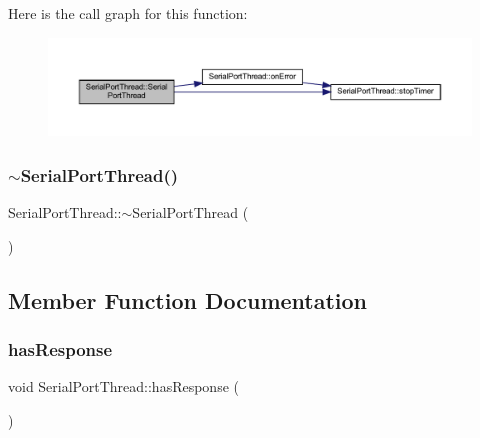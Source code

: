 Here is the call graph for this function\+:
\nopagebreak
\begin{figure}[H]
\begin{center}
\leavevmode
\includegraphics[width=350pt]{class_serial_port_thread_aa842675091fa3c6bb2d840bf73a246ed_cgraph}
\end{center}
\end{figure}
\mbox{\label{class_serial_port_thread_acb85c5610387d944672514d3ed81c72f}} 
\subsubsection{\texorpdfstring{$\sim$SerialPortThread()}{~SerialPortThread()}}
{\footnotesize\ttfamily Serial\+Port\+Thread\+::$\sim$\+Serial\+Port\+Thread (\begin{DoxyParamCaption}{ }\end{DoxyParamCaption})}



\subsection{Member Function Documentation}
\mbox{\label{class_serial_port_thread_aa052196772f8d1a3066030c4b10eb18d}} 
\subsubsection{\texorpdfstring{hasResponse}{hasResponse}}
{\footnotesize\ttfamily void Serial\+Port\+Thread\+::has\+Response (\begin{DoxyParamCaption}{ }\end{DoxyParamCaption})\hspace{0.3cm}{\ttfamily [signal]}}

